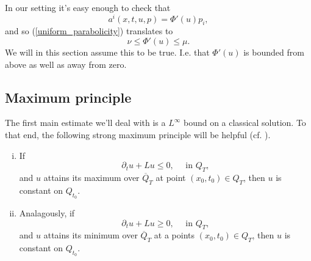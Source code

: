 \documentclass[11pt, a4paper]{article}
\begin{document}
In our setting it's easy enough to check that
\begin{equation*}
a^i(x,t,u,p) = \Phi'(u)p_i,
\end{equation*}
and so (\ref{uniform_parabolicity}) translates to
\begin{equation}
\label{uniform_parabGPME}
\nu \leq \Phi'(u) \leq \mu.
\end{equation}
We will in this section assume this to be true. I.e. that $\Phi'(u)$ is bounded from above as well as away from zero.
\subsection{Maximum principle}
The first main estimate we'll deal with is a $L^\infty$ bound on a classical solution. To that end, the following strong maximum principle will be helpful (cf. \citep[p. 396]{evans}).

\begin{theorem}
\begin{enumerate}[i)]
	Suppose $\Omega$ is connected, and $u\in C^{2,1}(Q_T)\cap C(\overline{Q}_T)$, then:
	\item If
	\begin{equation*}
		\partial_tu + Lu \leq 0, \quad \text{ in } Q_T, 
	\end{equation*}
	and $u$ attains its maximum over $\overline{Q}_T$ at point $(x_0,t_0)\in Q_T$, then
	$u$ is constant on $Q_{t_0}$.
	
	\item Analagously, if
	\begin{equation*}
		\partial_tu + Lu \geq 0, \quad \text{ in } Q_T, 
	\end{equation*}
	and $u$ attains its minimum over $\overline{Q}_T$ at a points  $(x_0,t_0) \in Q_T$, then $u$ is constant on $Q_{t_0}$.
\end{enumerate}
\end{theorem}
\end{document}

